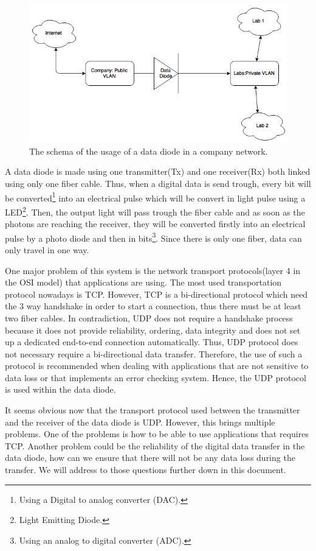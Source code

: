 \documentclass[a4paper,10pt]{article}
\begin{document}
\begin{figure}
\centering
\includegraphics[scale=0.45]{images/dataDiode.png}
\caption{The schema of the usage of a data diode in a company network.}
\label{fig:datadiode}
\end{figure}

A data diode is made using one transmitter(Tx) and one receiver(Rx) both linked using only one fiber cable. Thus, when a digital data is send trough, every bit will be converted\footnote{Using a Digital to analog converter (DAC).} into an electrical pulse which will be convert in light pulse using a LED\footnote{Light Emitting Diode.}. Then, the output light will pass trough the fiber cable and as soon as the photons are reaching the receiver, they will be converted firstly into an electrical pulse by a photo diode and then in bits\footnote{Using an analog to digital converter (ADC).}. Since there is only one fiber, data can only travel in one way.

One major problem of this system is the network transport protocols(layer 4 in the OSI model) that applications are using. The most used transportation protocol nowadays is TCP. However, TCP is a bi-directional protocol which need the 3 way handshake in order to start a connection, thus there must be at least two fiber cables. In contradiction, UDP does not require a handshake process because it does not provide reliability, ordering, data integrity and does not set up a dedicated end-to-end connection automatically. Thus, UDP protocol does not necessary require a bi-directional data transfer. Therefore, the use of such a protocol is recommended when dealing with applications that are not sensitive to data loss or that implements an error checking system. Hence, the UDP protocol is used within the data diode.

It seems obvious now that the transport protocol used between the transmitter and the receiver of the data diode is UDP. However, this brings multiple problems. One of the problems is how to be able to use applications that requires TCP. Another problem could be the reliability of the digital data transfer in the data diode, how can we ensure that there will not be any data loss during the transfer. We will address to those questions further down in this document.\bigskip
\end{document}

